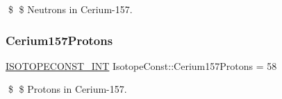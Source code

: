 \$ \$ Neutrons in Cerium-\/157. \mbox{\label{group___isotope_const-_cerium-_ce157_gad3d5368ea9a91268aa68f52a20054b42}} 
\subsubsection{\texorpdfstring{Cerium157\+Protons}{Cerium157Protons}}
{\footnotesize\ttfamily \mbox{\hyperlink{group___isotope_const-_macros_ga5f18360b3e99483a35c32d789e62621c}{I\+S\+O\+T\+O\+P\+E\+C\+O\+N\+S\+T\+\_\+\+I\+NT}} Isotope\+Const\+::\+Cerium157\+Protons = 58}

\$ \$ Protons in Cerium-\/157. 